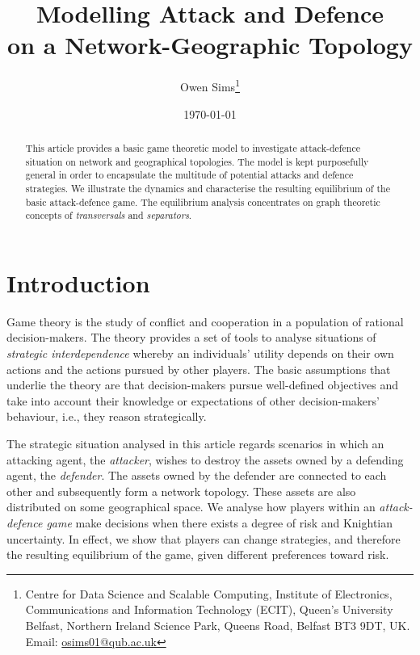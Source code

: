 \documentclass[11pt,fleqn]{article}
\begin{document}
\title{\textbf{Modelling Attack and Defence\\ on a Network-Geographic Topology}}
\author{Owen Sims\thanks{Centre for Data Science and Scalable Computing, Institute of Electronics, Communications and Information Technology (ECIT), Queen's University Belfast, Northern Ireland Science Park, Queens Road, Belfast BT3 9DT, UK. Email: \href{osims01@qub.ac.uk}{osims01@qub.ac.uk}}}
\date{\today}
\maketitle

\begin{abstract}
\singlespace\noindent
This article provides a basic game theoretic model to investigate attack-defence situation on network and geographical topologies. The model is kept purposefully general in order to encapsulate the multitude of potential attacks and defence strategies. We illustrate the dynamics and characterise the resulting equilibrium of the basic attack-defence game. The equilibrium analysis concentrates on graph theoretic concepts of \emph{transversals} and \emph{separators}.
\end{abstract}

\section{Introduction}

Game theory is the study of conflict and cooperation in a population of rational decision-makers. The theory provides a set of tools to analyse situations of \emph{strategic interdependence} whereby an individuals' utility depends on their own actions and the actions pursued by other players. The basic assumptions that underlie the theory are that decision-makers pursue well-defined objectives and take into account their knowledge or expectations of other decision-makers' behaviour, i.e., they reason strategically.

The strategic situation analysed in this article regards scenarios in which an attacking agent, the \emph{attacker}, wishes to destroy the assets owned by a defending agent, the \emph{defender}. The assets owned by the defender are connected to each other and subsequently form a network topology. These assets are also distributed on some geographical space. We analyse how players within an \emph{attack-defence game} make decisions when there exists a degree of risk and Knightian uncertainty. In effect, we show that players can change strategies, and therefore the resulting equilibrium of the game, given different preferences toward risk.
\end{document}
